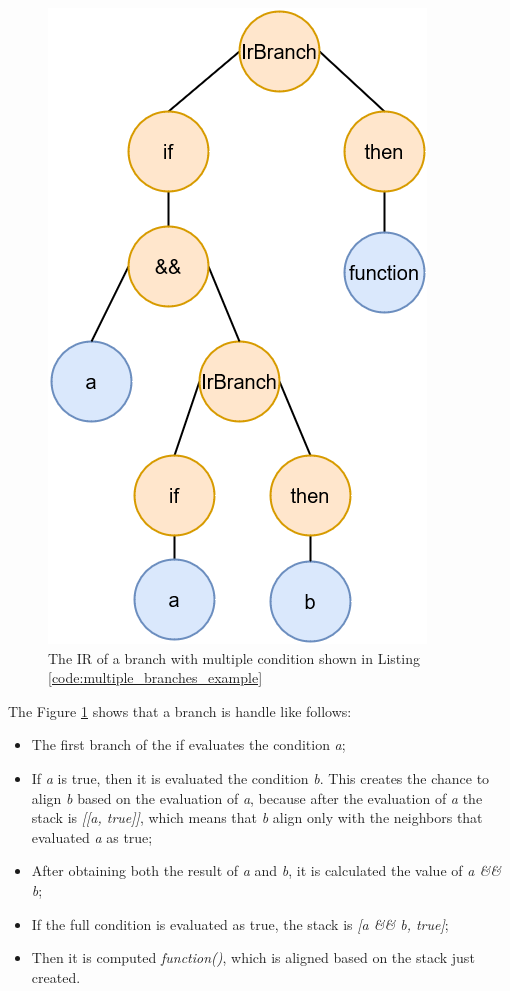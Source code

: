 \begin{figure}[!ht]
    \centering
    \includegraphics[scale=0.55]{document/chapters/3-alignment/images/ir_representation_branches.png}
    \caption{The IR of a branch with multiple condition shown in Listing \ref{code:multiple_branches_example}}
    \label{fig:multiple_branches_ir_example}
\end{figure}
The Figure \ref{fig:multiple_branches_ir_example} shows that a branch is handle like follows:
\begin{itemize}
    \item The first branch of the if evaluates the condition \textit{a};
    \item If \textit{a} is true, then it is evaluated the condition \textit{b}. This creates the chance to align \textit{b} based on the evaluation of \textit{a}, because after the evaluation of \textit{a} the stack is \textit{[[a, true]]}, which means that \textit{b} align only with the neighbors that evaluated \textit{a} as true;
    \item After obtaining both the result of \textit{a} and \textit{b}, it is calculated the value of \textit{a \&\& b};
    \item If the full condition is evaluated as true, the stack is \textit{[a \&\& b, true]};
    \item Then it is computed \textit{function()}, which is aligned based on the stack just created.
\end{itemize}

